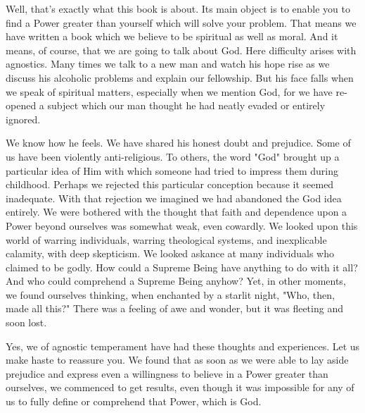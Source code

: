 \begin{biblechapter}
    Well, that's exactly what this book is about. 
Its main object is to enable you to find a Power greater than yourself 
which will solve your problem. 
That means we have written a book which we believe to be spiritual as well as moral. 
And it means, of course, that we are going to talk about God. 
Here difficulty arises with agnostics. 
Many times we talk to a new man and watch his hope rise 
as we discuss his alcoholic problems and explain our fellowship. 
But his face falls when we speak of spiritual matters, 
especially when we mention God, 
for we have re-opened a subject which our man thought he had neatly evaded 
or entirely ignored.

We know how he feels. 
We have shared his honest doubt and prejudice. 
Some of us have been violently anti-religious. 
To others, the word "God" brought up a particular idea of Him with which someone had tried to impress them during childhood. 
Perhaps we rejected this particular conception because it seemed inadequate. 
With that rejection we imagined we had abandoned the God idea entirely. 
We were bothered with the thought that faith and dependence upon a Power beyond ourselves 
was somewhat weak, even cowardly. 
We looked upon this world of warring individuals, warring theological systems, and inexplicable calamity, 
with deep skepticism. 
We looked askance at many individuals who claimed to be godly. 
How could a Supreme Being have anything to do with it all? 
And who could comprehend a Supreme Being anyhow? 
Yet, in other moments, we found ourselves thinking, when enchanted by a starlit night, 
"Who, then, made all this?" 
There was a feeling of awe and wonder, but it was fleeting and soon lost.

Yes, we of agnostic temperament have had these thoughts and experiences. 
Let us make haste to reassure you. 
We found that as soon as we were able to lay aside prejudice 
and express even a willingness to believe in a Power greater than ourselves, 
we commenced to get results, 
even though it was impossible for any of us to fully define or comprehend that Power, 
which is God.
\end{biblechapter}


